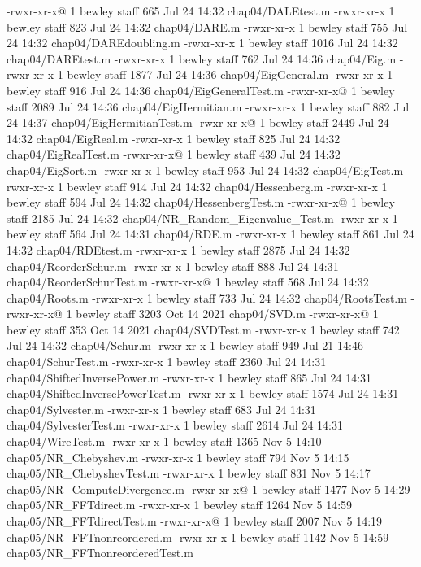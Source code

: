 -rwxr-xr-x@ 1 bewley  staff    665 Jul 24 14:32 chap04/DALEtest.m
-rwxr-xr-x  1 bewley  staff    823 Jul 24 14:32 chap04/DARE.m
-rwxr-xr-x  1 bewley  staff    755 Jul 24 14:32 chap04/DAREdoubling.m
-rwxr-xr-x  1 bewley  staff   1016 Jul 24 14:32 chap04/DAREtest.m
-rwxr-xr-x  1 bewley  staff    762 Jul 24 14:36 chap04/Eig.m
-rwxr-xr-x  1 bewley  staff   1877 Jul 24 14:36 chap04/EigGeneral.m
-rwxr-xr-x  1 bewley  staff    916 Jul 24 14:36 chap04/EigGeneralTest.m
-rwxr-xr-x@ 1 bewley  staff   2089 Jul 24 14:36 chap04/EigHermitian.m
-rwxr-xr-x  1 bewley  staff    882 Jul 24 14:37 chap04/EigHermitianTest.m
-rwxr-xr-x@ 1 bewley  staff   2449 Jul 24 14:32 chap04/EigReal.m
-rwxr-xr-x  1 bewley  staff    825 Jul 24 14:32 chap04/EigRealTest.m
-rwxr-xr-x@ 1 bewley  staff    439 Jul 24 14:32 chap04/EigSort.m
-rwxr-xr-x  1 bewley  staff    953 Jul 24 14:32 chap04/EigTest.m
-rwxr-xr-x  1 bewley  staff    914 Jul 24 14:32 chap04/Hessenberg.m
-rwxr-xr-x  1 bewley  staff    594 Jul 24 14:32 chap04/HessenbergTest.m
-rwxr-xr-x@ 1 bewley  staff   2185 Jul 24 14:32 chap04/NR_Random_Eigenvalue_Test.m
-rwxr-xr-x  1 bewley  staff    564 Jul 24 14:31 chap04/RDE.m
-rwxr-xr-x  1 bewley  staff    861 Jul 24 14:32 chap04/RDEtest.m
-rwxr-xr-x  1 bewley  staff   2875 Jul 24 14:32 chap04/ReorderSchur.m
-rwxr-xr-x  1 bewley  staff    888 Jul 24 14:31 chap04/ReorderSchurTest.m
-rwxr-xr-x@ 1 bewley  staff    568 Jul 24 14:32 chap04/Roots.m
-rwxr-xr-x  1 bewley  staff    733 Jul 24 14:32 chap04/RootsTest.m
-rwxr-xr-x@ 1 bewley  staff   3203 Oct 14  2021 chap04/SVD.m
-rwxr-xr-x@ 1 bewley  staff    353 Oct 14  2021 chap04/SVDTest.m
-rwxr-xr-x  1 bewley  staff    742 Jul 24 14:32 chap04/Schur.m
-rwxr-xr-x  1 bewley  staff    949 Jul 21 14:46 chap04/SchurTest.m
-rwxr-xr-x  1 bewley  staff   2360 Jul 24 14:31 chap04/ShiftedInversePower.m
-rwxr-xr-x  1 bewley  staff    865 Jul 24 14:31 chap04/ShiftedInversePowerTest.m
-rwxr-xr-x  1 bewley  staff   1574 Jul 24 14:31 chap04/Sylvester.m
-rwxr-xr-x  1 bewley  staff    683 Jul 24 14:31 chap04/SylvesterTest.m
-rwxr-xr-x  1 bewley  staff   2614 Jul 24 14:31 chap04/WireTest.m
-rwxr-xr-x  1 bewley  staff   1365 Nov  5 14:10 chap05/NR_Chebyshev.m
-rwxr-xr-x  1 bewley  staff    794 Nov  5 14:15 chap05/NR_ChebyshevTest.m
-rwxr-xr-x  1 bewley  staff    831 Nov  5 14:17 chap05/NR_ComputeDivergence.m
-rwxr-xr-x@ 1 bewley  staff   1477 Nov  5 14:29 chap05/NR_FFTdirect.m
-rwxr-xr-x  1 bewley  staff   1264 Nov  5 14:59 chap05/NR_FFTdirectTest.m
-rwxr-xr-x@ 1 bewley  staff   2007 Nov  5 14:19 chap05/NR_FFTnonreordered.m
-rwxr-xr-x  1 bewley  staff   1142 Nov  5 14:59 chap05/NR_FFTnonreorderedTest.m
